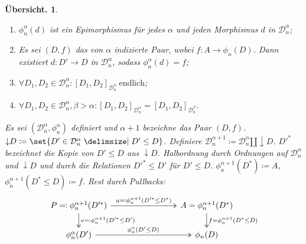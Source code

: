 \documentclass[a4paper, parskip=half,11pt]{scrartcl}
\theoremstyle{marginbreak}
\theoremstyle{nonumberplain}
\newtheorem{overview}{Übersicht.}
\newcommand\cat\mathcal
\newcommand{\down}[1]{{\downarrow}#1}
\newcommand{\n}{\pgfmatrixnextcell}
\begin{document}
{\begin{overview}
\begin{enumerate}[label=(\alph*),noitemsep]
				\item $\phi_n^\alpha(d)$ ist ein Epimorphismus für jedes $\alpha$ und jeden
					Morphismus $d$ in $\cat{D}_n^\alpha$;
				\item Es sei $(D, f)$ das von $\alpha$ indizierte Paar, wobei
					$f\colon A\to\phi_n(D)$. Dann existiert $d\colon D'\to D$ in
					$\cat{D}_n^\alpha$, sodass $\phi_n^\alpha(d) = f$;
				\item $\forall D_1, D_2\in\cat{D}_{n}^\alpha: [D_1, D_2]_{\cat{D}_n^\alpha}~\text{endlich}$;
				\item $\forall D_1, D_2\in\cat{D}_{n}^\alpha, \beta>\alpha: [D_1, D_2]_{\cat{D}_n^\alpha} = [D_1, D_2]_{\cat{D}_{n}^{\beta}}$.
			\end{enumerate}
			Es sei $(\cat{D}_n^\alpha,
			\phi_n^\alpha)$ definiert und $\alpha+1$ bezeichne das Paar $(D, f)$.
			$\down{D}\coloneqq\set{D'\in\cat{D}_n^\alpha\given D'\leq D}$. Definiere
			$\cat{D}_n^{\alpha+1}\coloneqq\cat{D}_n^\alpha\amalg\down{D}$. $D'^*$
			bezeichnet die Kopie von $D'\leq D$ aus $\down{D}$. Halbordnung durch
			Ordnungen auf $\cat{D}_n^\alpha$ und $\down{D}$ und durch die Relationen
			$D'^*\leq D'$ für $D'\leq D$. $\phi_n^{\alpha+1}(D^*)\coloneqq A$,
			$\phi_n^{\alpha+1}(D^*\leq D)\coloneqq f$. Rest durch Pullbacks:
			\[
				\begin{tikzcd}[column sep=8em]
					P \eqqcolon \phi_n^{\alpha+1}(D'^*)
						\ar[two heads]{d}{v\eqqcolon \phi_n^{\alpha + 1}(D'^*\leq D')}
						\ar[two heads]{r}{u\eqqcolon \phi_n^{\alpha+1}(D'^*\leq D^*)}
					\n A=\phi_n^{\alpha+1}(D^*)
						\ar[two heads]{d}{f = \phi_n^{\alpha+1}(D^*\leq D)}\\
					\phi_n^\alpha(D') \ar[two heads]{r}{\phi_n^\alpha(D'\leq D)} \n \phi_n(D)
				\end{tikzcd}
			\]
		\end{overview}}
\end{document}
